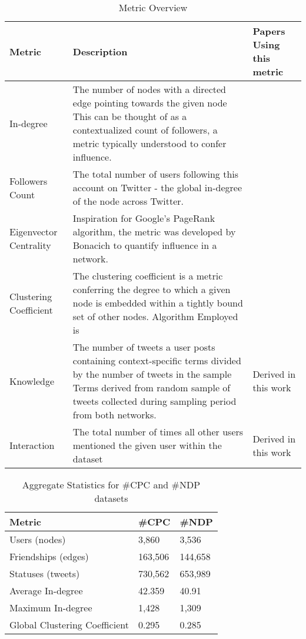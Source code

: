 \documentclass[a4paper,12pt]{article}
\begin{document}
\begin{table}[position specifier]
  \centering
  \begin{tabular}{| p{2cm} | p{6cm} | p{6cm} |}
    \hline
    Metric & Description & Papers Using this metric \\ \hline
    In-degree & The number of nodes with a directed edge pointing towards the given node This can be thought of as a contextualized count of followers, a metric typically understood to confer influence. & \cite{ChaHaddadiBenevenutoGummadi2010, JavaSongFininTseng2007, RomeroKleinberg2010} \\ \hline
    Followers Count & The total number of users following this account on Twitter - the global in-degree of the node across Twitter. & \cite{MendoaPobleteCastillo2010, KwakLeeParkMoon2010, WuHofmanMasonWatts2011} \\ \hline
    Eigenvector Centrality & Inspiration for Google’s PageRank algorithm, the metric was developed by Bonacich \citeyear{Bonacich1972} to quantify influence in a network. & \cite{WeitzelQuaresmadeOliveira2012, BigonhaCardosoMoroAlmeidaGoncalves2010} \\ \hline
    Clustering Coefficient & The clustering coefficient is a metric conferring the degree to which a given node is embedded within a tightly bound set of other nodes. Algorithm Employed is \cite{Latapy2008} & \cite{LermanGhosh2011, JavaSongFininTseng2007} \\ \hline
    Knowledge & The number of tweets a user posts containing context-specific terms divided by the number of tweets in the sample Terms derived from random sample of tweets collected during sampling period from both networks. & Derived in this work \\ \hline
    Interaction & The total number of times all other users mentioned the given user within the dataset & Derived in this work \\ \hline
    \hline
  \end{tabular}
  \caption{Metric Overview}
  \label{tab:metric_overview}
\end{table}

\begin{table}[position specifier]
  \centering
  \begin{tabular}{| l | l | l |}
    \hline
    Metric & \#CPC & \#NDP \\ \hline
    Users (nodes) & 3,860 & 3,536 \\ \hline
    Friendships (edges) & 163,506 & 144,658 \\ \hline
    Statuses (tweets) & 730,562 & 653,989 \\ \hline
    Average In-degree & 42.359 & 40.91 \\ \hline
    Maximum In-degree & 1,428 & 1,309 \\ \hline
    Global Clustering Coefficient & 0.295 & 0.285 \\ \hline
    \hline
  \end{tabular}
  \caption{Aggregate Statistics for \#CPC and \#NDP datasets}
  \label{tab:aggregate_dataset_stats}
\end{table}
\end{document}
